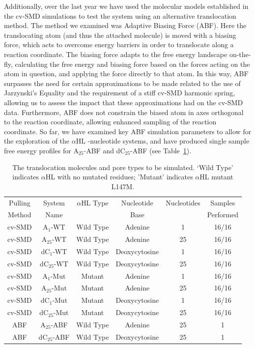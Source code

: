 \documentclass[a4paper,10pt]{article}
\newcommand{\dctfnsp}{dC$_{25}$}
\newcommand{\atfnsp}{A$_{25}$}
\newcommand{\dconsp}{dC$_{1}$}
\newcommand{\aonsp}{A$_{1}$}
\newcommand{\ahl}{$\alpha$HL }
\begin{document}
Additionally, over the last year we have used the molecular models established in the cv-SMD simulations to test the system using an alternative translocation method. The method we examined was Adaptive Biasing Force (ABF). Here the translocating atom (and thus the attached molecule) is moved with a biasing force, which acts to overcome energy barriers in order to translocate along a reaction coordinate. The biasing force adapts to the free energy landscape on-the-fly, calculating the free energy and biasing force based on the forces acting on the atom in question, and applying the force directly to that atom. In this way, ABF surpasses the need for certain approximations to be made related to the use of Jarzynski's Equality and the requirement of a stiff cv-SMD harmonic spring, allowing us to assess the impact that these approximations had on the cv-SMD data. Furthermore, ABF does not constrain the biased atom in axes orthogonal to the reaction coordinate, allowing enhanced sampling of the reaction coordinate. So far, we have examined key ABF simulation parameters to allow for the exploration of the \ahl-nucleotide systems, and have produced single sample free energy profiles for \atfnsp-ABF and \dctfnsp-ABF (see Table~\ref{table:systems1}).



\begin{table}[!h]
\begin{center}
  \caption{The translocation molecules and pore types to be simulated. `Wild Type' indicates \ahl with no mutated residues; 'Mutant' indicates \ahl mutant L147M.\newline }
\label{table:systems1}
\begin{tabular}{| c | c | c | c | c | c |}
\hline
Pulling & System & \ahl Type & Nucleotide & Nucleotides & Samples \\
Method & Name &  & Base &  & Performed \\
\hline
cv-SMD & \aonsp-WT & Wild Type & Adenine & 1 & 16/16  \\
cv-SMD & \atfnsp-WT & Wild Type & Adenine & 25 & 16/16  \\
cv-SMD & \dconsp-WT & Wild Type & Deoxycytosine & 1 & 16/16  \\
cv-SMD & \dctfnsp-WT & Wild Type & Deoxycytosine & 25 & 16/16 \\
cv-SMD & \aonsp-Mut & Mutant & Adenine & 1 & 16/16  \\
cv-SMD & \atfnsp-Mut & Mutant & Adenine & 25 & 16/16  \\
cv-SMD & \dconsp-Mut & Mutant & Deoxycytosine & 1 & 16/16  \\
cv-SMD & \dctfnsp-Mut & Mutant & Deoxycytosine & 25 & 16/16  \\
ABF & \atfnsp-ABF & Wild Type & Adenine & 25 & 1  \\
ABF & \dctfnsp-ABF & Wild Type & Deoxycytosine & 25 & 1  \\
\hline
\end{tabular}
\end{center}
\end{table}
\end{document}
